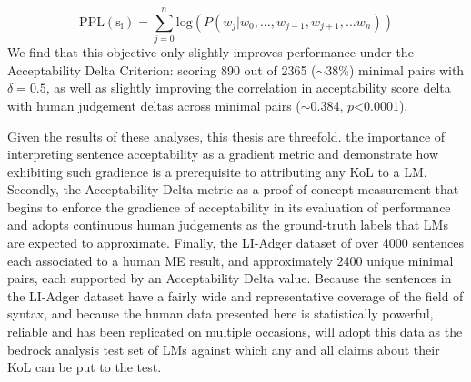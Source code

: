 \begin{equation}
    \mathrm{PPL(s_i)} = \sum^{n}_{j=0} \mathrm{log}(P(w_j|w_0,...,w_{j-1},w_{j+1},...w_n))
\end{equation}
We find that this objective only slightly improves performance under the Acceptability Delta Criterion: scoring 890 out of 2365 ($\sim$38\%) minimal pairs with $\delta = 0.5$, as well as slightly improving the correlation in acceptability score delta with human judgement deltas across minimal pairs ($\sim$0.384, $p$<0.0001).  

Given the results of these analyses, \DIFdelbegin {}\DIFdelend \DIFaddbegin {}\DIFaddend this thesis are threefold.  \DIFdelbegin {}\DIFdelend \DIFaddbegin {}\DIFaddend the importance of interpreting sentence acceptability as a gradient metric and demonstrate how exhibiting such gradience is a prerequisite to attributing any KoL to a LM.  Secondly, \DIFdelbegin {}\DIFdelend \DIFaddbegin {}\DIFaddend the Acceptability Delta metric as a proof of concept measurement that begins to enforce the gradience of acceptability in its evaluation of performance and adopts continuous human judgements as the ground-truth labels that LMs are expected to approximate.  Finally, \DIFdelbegin {}\DIFdelend \DIFaddbegin {}\DIFaddend the LI-Adger dataset of over 4000 sentences each associated to a human ME result, and approximately 2400 unique minimal pairs, each supported by an Acceptability Delta value.  Because the sentences in the LI-Adger dataset have a fairly wide and representative coverage of the field of syntax, and because the human data presented here is statistically powerful, reliable and has been replicated on multiple occasions, \DIFdelbegin {}\DIFdelend \DIFaddbegin {}\DIFaddend will adopt this data as the bedrock analysis test set of LMs against which any and all claims about their KoL can be put to the test.